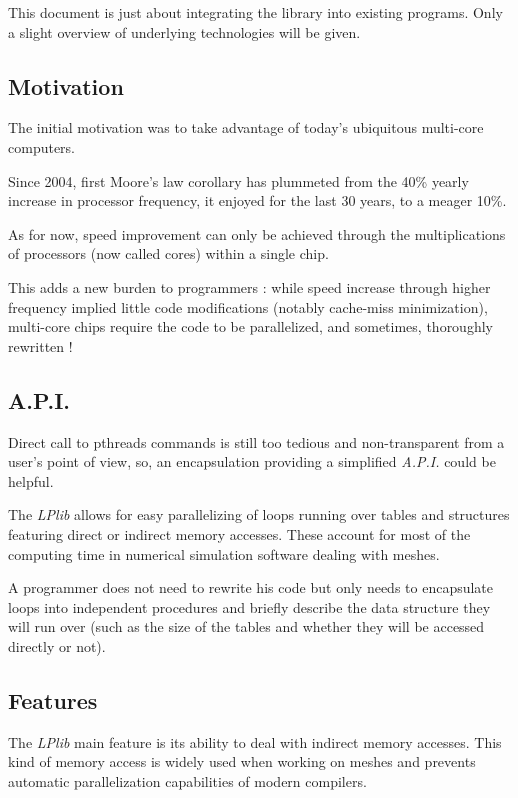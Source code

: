 \documentclass[a4paper,12pt]{article}
\begin{document}
This document is just about integrating the library into existing programs. Only a slight overview of underlying technologies will be given.

\subsection{Motivation}

The initial motivation was to take advantage of today's ubiquitous multi-core computers.

Since 2004, first Moore's law corollary has plummeted from the 40\% yearly increase in processor frequency, it enjoyed for the last 30 years, to a meager 10\%.

As for now, speed improvement can only be achieved through the multiplications of processors (now called cores) within a single chip.

This adds a new burden to programmers : while speed increase through higher frequency implied little code modifications (notably cache-miss minimization), multi-core chips require the code to be parallelized, and sometimes, thoroughly rewritten !

\subsection{A.P.I.}

Direct call to pthreads commands is still too tedious and non-transparent from a user's point of view, so, an encapsulation providing a simplified \emph{A.P.I.} could be helpful.

The \emph{LPlib} allows for easy parallelizing of loops running over tables and structures featuring direct or indirect memory accesses. These account for most of the computing time in numerical simulation software dealing with meshes.

A programmer does not need to rewrite his code but only needs to encapsulate loops into independent procedures and briefly describe the data structure they will run over (such as the size of the tables and whether they will be accessed directly or not).

\subsection{Features}

The \emph{LPlib} main feature is its ability to deal with indirect memory accesses. This kind of memory access is widely used when working on meshes and prevents automatic parallelization capabilities of modern compilers.
\end{document}
